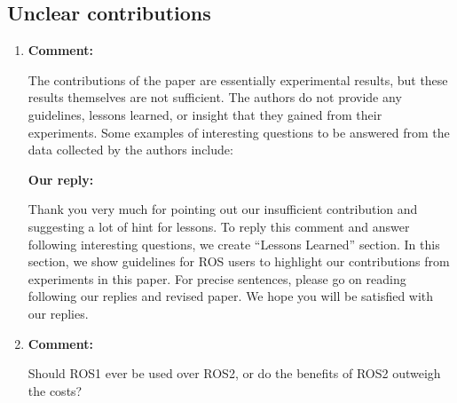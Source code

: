 \documentclass{article}
\begin{document}
\begin{enumerate}
\end{enumerate}

\subsection{Unclear contributions}
\begin{enumerate}

\item \begin{flushleft}
  \textbf{Comment:}
\end{flushleft}
  The contributions of the paper are essentially experimental results, but these results themselves are not sufficient. The authors do not provide any guidelines, lessons learned, or insight that they gained from their experiments.  Some examples of interesting questions to be answered from the data collected by the authors include:

  \begin{flushleft}
    \textbf{Our reply:}
  \end{flushleft}
  Thank you very much for pointing out our insufficient contribution and suggesting a lot of hint for lessons.
  To reply this comment and answer following interesting questions, we create ``Lessons Learned'' section.
  In this section, we show guidelines for ROS users to highlight our contributions from experiments in this paper.
  For precise sentences, please go on reading following our replies and revised paper.
  We hope you will be satisfied with our replies.

\item \begin{flushleft}
  \textbf{Comment:}
\end{flushleft}
  Should ROS1 ever be used over ROS2, or do the benefits of ROS2 outweigh the costs?


\end{enumerate}
\end{document}
